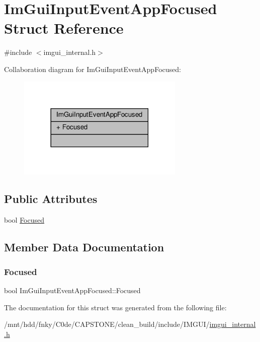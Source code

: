 \hypertarget{structImGuiInputEventAppFocused}{}\section{Im\+Gui\+Input\+Event\+App\+Focused Struct Reference}
\label{structImGuiInputEventAppFocused}


{\ttfamily \#include $<$imgui\+\_\+internal.\+h$>$}



Collaboration diagram for Im\+Gui\+Input\+Event\+App\+Focused\+:
\nopagebreak
\begin{figure}[H]
\begin{center}
\leavevmode
\includegraphics[width=225pt]{structImGuiInputEventAppFocused__coll__graph}
\end{center}
\end{figure}
\subsection*{Public Attributes}
\begin{DoxyCompactItemize}
\item 
bool \hyperlink{structImGuiInputEventAppFocused_a5da1aaa6b0be42c9a46c788bb86b8d93}{Focused}
\end{DoxyCompactItemize}


\subsection{Member Data Documentation}
\mbox{\label{structImGuiInputEventAppFocused_a5da1aaa6b0be42c9a46c788bb86b8d93}} 
\subsubsection{\texorpdfstring{Focused}{Focused}}
{\footnotesize\ttfamily bool Im\+Gui\+Input\+Event\+App\+Focused\+::\+Focused}



The documentation for this struct was generated from the following file\+:\begin{DoxyCompactItemize}
\item 
/mnt/hdd/fnky/\+C0de/\+C\+A\+P\+S\+T\+O\+N\+E/clean\+\_\+build/include/\+I\+M\+G\+U\+I/\hyperlink{imgui__internal_8h}{imgui\+\_\+internal.\+h}\end{DoxyCompactItemize}
